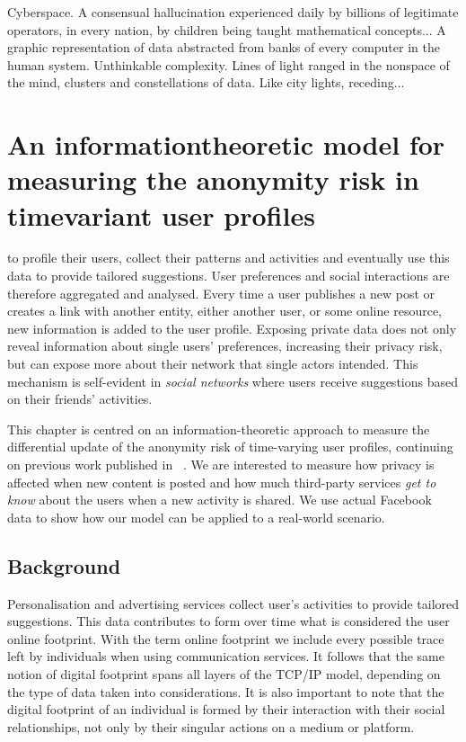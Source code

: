 \begin{savequote}[75mm]
Cyberspace. A consensual hallucination experienced daily by billions of legitimate operators, in every nation, by children being taught mathematical concepts... A graphic representation of data abstracted from banks of every computer in the human system. Unthinkable complexity. Lines of light ranged in the nonspace of the mind, clusters and constellations of data. Like city lights, receding...
\end{savequote}

\chapter{An information\hyph theoretic model for measuring the anonymity risk in time\hyph variant user profiles}

 to profile their users, collect their patterns and activities and eventually use this data to provide tailored suggestions. User preferences and social interactions are therefore aggregated and analysed. Every time a user publishes a new post or creates a link with another entity, either another user, or some online resource, new information is added to the user profile. Exposing private data does not only reveal information about single users' preferences, increasing their privacy risk, but can expose more about their network that single actors intended. This mechanism is self-evident in \emph{social networks} where users receive suggestions based on their friends' activities.

This chapter is centred on an information-theoretic approach to measure the differential update of the anonymity risk of time-varying user profiles, continuing on previous work published in ~\cite{puglisi2017anonymity}. We are interested to measure how privacy is affected when new content is posted and how much third-party services \emph{get to know} about the users when a new activity is shared. We use actual Facebook data to show how our model can be applied to a real-world scenario.

\section{Background}
\noindent
Personalisation and advertising services collect user's activities to provide tailored suggestions. This data contributes to form over time what is considered the user online footprint. With the term online footprint we include every possible trace left by individuals when using communication services. It follows that the same notion of digital footprint spans all layers of the TCP/IP model, depending on the type of data taken into considerations. It is also important to note that the digital footprint of an individual is formed by their interaction with their social relationships, not only by their singular actions on a medium or platform. 


